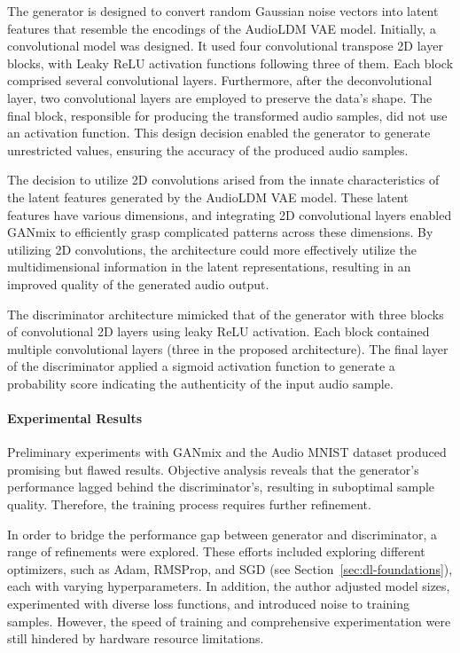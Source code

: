 The generator is designed to convert random Gaussian noise vectors into latent features that resemble the encodings of the AudioLDM \ac{VAE} model. Initially, a convolutional model was designed. It used four convolutional transpose 2D layer blocks, with Leaky \ac{ReLU} activation functions following three of them. Each block comprised several convolutional layers. Furthermore, after the deconvolutional layer, two convolutional layers are employed to preserve the data's shape. The final block, responsible for producing the transformed audio samples, did not use an activation function. This design decision enabled the generator to generate unrestricted values, ensuring the accuracy of the produced audio samples.

The decision to utilize 2D convolutions arised from the innate characteristics of the latent features generated by the AudioLDM \ac{VAE} model. These latent features have various dimensions, and integrating 2D convolutional layers enabled GANmix to efficiently grasp complicated patterns across these dimensions. By utilizing 2D convolutions, the architecture could more effectively utilize the multidimensional information in the latent representations, resulting in an improved quality of the generated audio output.

The discriminator architecture mimicked that of the generator with three blocks of convolutional 2D layers using leaky \ac{ReLU} activation. Each block contained multiple convolutional layers (three in the proposed architecture). The final layer of the discriminator applied a sigmoid activation function to generate a probability score indicating the authenticity of the input audio sample.

\paragraph{Experimental Results}

Preliminary experiments with GANmix and the Audio MNIST dataset produced promising but flawed results. Objective analysis reveals that the generator's performance lagged behind the discriminator's, resulting in suboptimal sample quality. Therefore, the training process requires further refinement.

In order to bridge the performance gap between generator and discriminator, a range of refinements were explored. These efforts included exploring different optimizers, such as Adam, RMSProp, and SGD (see Section~\ref{sec:dl-foundations}), each with varying hyperparameters. In addition, the author adjusted model sizes, experimented with diverse loss functions, and introduced noise to training samples. However, the speed of training and comprehensive experimentation were still hindered by hardware resource limitations.

